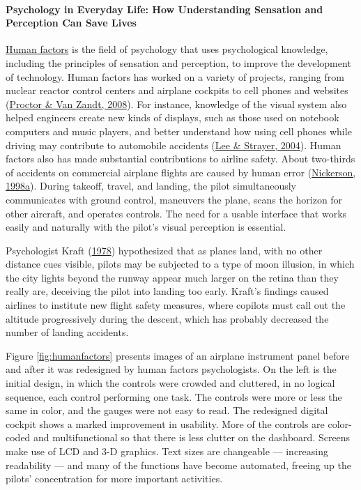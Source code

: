 \documentclass[
]{krantz}
\begin{document}
\hypertarget{psychology-in-everyday-life-how-understanding-sensation-and-perception-can-save-lives}{%
\paragraph*{Psychology in Everyday Life: How Understanding Sensation and Perception Can Save Lives}\label{psychology-in-everyday-life-how-understanding-sensation-and-perception-can-save-lives}}

\protect\hyperlink{human-factors}{Human factors} is the field of psychology that uses psychological knowledge, including the principles of sensation and perception, to improve the development of technology. Human factors has worked on a variety of projects, ranging from nuclear reactor control centers and airplane cockpits to cell phones and websites (\protect\hyperlink{ref-Proctor2008}{Proctor \& Van Zandt, 2008}). For instance, knowledge of the visual system also helped engineers create new kinds of displays, such as those used on notebook computers and music players, and better understand how using cell phones while driving may contribute to automobile accidents (\protect\hyperlink{ref-Lee2004}{Lee \& Strayer, 2004}). Human factors also has made substantial contributions to airline safety. About two-thirds of accidents on commercial airplane flights are caused by human error (\protect\hyperlink{ref-Nickerson1998}{Nickerson, 1998a}). During takeoff, travel, and landing, the pilot simultaneously communicates with ground control, maneuvers the plane, scans the horizon for other aircraft, and operates controls. The need for a usable interface that works easily and naturally with the pilot's visual perception is essential.

Psychologist Kraft (\protect\hyperlink{ref-Kraft1978}{1978}) hypothesized that as planes land, with no other distance cues visible, pilots may be subjected to a type of moon illusion, in which the city lights beyond the runway appear much larger on the retina than they really are, deceiving the pilot into landing too early. Kraft's findings caused airlines to institute new flight safety measures, where copilots must call out the altitude progressively during the descent, which has probably decreased the number of landing accidents.

Figure \ref{fig:humanfactors} presents images of an airplane instrument panel before and after it was redesigned by human factors psychologists. On the left is the initial design, in which the controls were crowded and cluttered, in no logical sequence, each control performing one task. The controls were more or less the same in color, and the gauges were not easy to read. The redesigned digital cockpit shows a marked improvement in usability. More of the controls are color-coded and multifunctional so that there is less clutter on the dashboard. Screens make use of LCD and 3-D graphics. Text sizes are changeable --- increasing readability --- and many of the functions have become automated, freeing up the pilots' concentration for more important activities.
\end{document}
